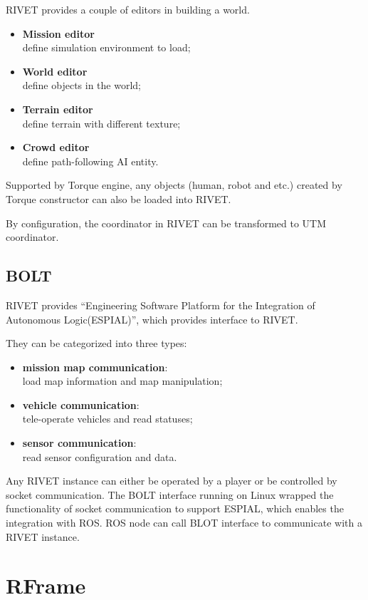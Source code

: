 \documentclass[12pt]{article}
\begin{document}
RIVET provides a couple of editors in building a world. 
\begin{itemize}
\item \textbf{Mission editor} \\
define simulation environment to load;
\item \textbf{World editor} \\
define objects in the world;
\item \textbf{Terrain editor} \\
define terrain with different texture;
\item \textbf{Crowd editor} \\
define path-following AI entity.
\end{itemize}

Supported by Torque engine, any objects (human, robot and etc.) created by Torque constructor can also be loaded into RIVET.

By configuration, the coordinator in RIVET can be transformed to UTM coordinator.

\subsection{BOLT}

RIVET provides ``Engineering Software Platform for the Integration of Autonomous Logic(ESPIAL)'', which provides interface to RIVET.

They can be categorized into three types:
\begin{itemize}
\item \textbf{mission map communication}: \\
load map information and map manipulation;
\item \textbf{vehicle communication}: \\
tele-operate vehicles and read statuses; 
\item \textbf{sensor communication}: \\
read sensor configuration and data.
\end{itemize}

Any RIVET instance can either be operated by a player or be controlled by socket communication. The BOLT interface running on Linux wrapped the functionality of socket communication to support ESPIAL, which enables the integration with ROS. ROS node can call BLOT interface to communicate with a RIVET instance.

\section{RFrame}
\end{document}
